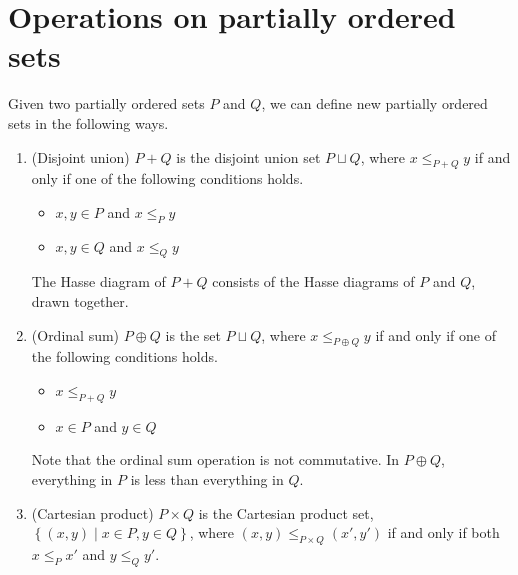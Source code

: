 \documentclass[11pt]{article}
\begin{document}
\section{Operations on partially ordered sets}
Given two partially ordered sets $P$ and $Q$, we can define
new partially ordered sets in the following ways.
\begin{enumerate}
\item
(Disjoint union)
$P + Q$ is the disjoint union set $P \sqcup Q$,
where $x \leq_{P+Q} y$ if and only if one of the following conditions holds.
\begin{itemize}
    \item $x, y \in P$ and $x \leq_P y$
    \item $x, y \in Q$ and $x \leq_Q y$
\end{itemize}
The Hasse diagram of $P + Q$ consists of the Hasse diagrams of $P$ and $Q$,
drawn together.
\item
(Ordinal sum)
$P \oplus Q$ is the set $P \sqcup Q$,
where $x \leq_{P \oplus Q} y$ if and only if one of the following conditions holds.
\begin{itemize}
    \item $x \leq_{P+Q} y$
    \item $x \in P$ and $y \in Q$
\end{itemize}
Note that the ordinal sum operation is not commutative. In $P \oplus Q$,
everything in $P$ is less than everything in $Q$.
\item
(Cartesian product)
$P \times Q$ is the Cartesian product set, $\left\{ (x,y) \mid x \in P, y \in Q \right\}$,
where $(x,y) \leq_{P \times Q} (x',y')$ if and only if both $x \leq_P x'$ and $y \leq_Q y'$.


\end{enumerate}
\end{document}
